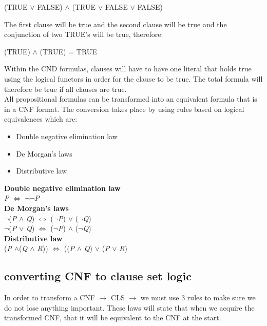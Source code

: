\documentclass[11pt,a4paper]{article}
\begin{document}
\begin{center}
(TRUE $\lor$ FALSE) $\land$ (TRUE $\lor$ FALSE $\lor$ FALSE) 
\end{center}
The first clause will be true and the second clause will be true and the conjunction of two TRUE's will be true, therefore: 

\begin{center}
(TRUE) $\land$ (TRUE) = TRUE
\end{center}
Within the CND formulas, clauses will have to have one literal that holds true using the logical functors in order for the clause to be true. The total formula will therefore be true if all clauses are true. \\
All propositional formulas can be transformed into an equivalent formula that is in a CNF format. The conversion takes place by using rules based on logical equivalences which are:

\begin{itemize}
\item Double negative elimination law
\item De Morgan's laws
\item Distributive law
\end{itemize}

\noindent \textbf{Double negative elimination law}\\
\textit{P} $\Leftrightarrow$ $\neg$$\neg$\textit{P}\\

\noindent \textbf{De Morgan's laws}\\
$\neg$(\textit{P} $\land$ \textit{Q}) $\Leftrightarrow$ ($\neg$\textit{P}) $\lor$ ($\neg$\textit{Q})\\
$\neg$(\textit{P} $\lor$ \textit{Q}) $\Leftrightarrow$ ($\neg$\textit{P}) $\land$ ($\neg$\textit{Q})\\

\noindent \textbf{Distributive law}\\
(\textit{P} $\land$(\textit{Q $\land$ \textit{R}})) $\Leftrightarrow$ ((\textit{P} $\land$ \textit{Q}) $\lor$ (\textit{P} $\lor$ \textit{R})

\subsection{converting CNF to clause set logic}
In order to transform a CNF $\rightarrow$ CLS $\rightarrow$ we must use 3 rules to make sure we do not lose anything important. These laws will state that when we acquire the transformed CNF, that it will be equivalent to the CNF at the start. \\
\end{document}
